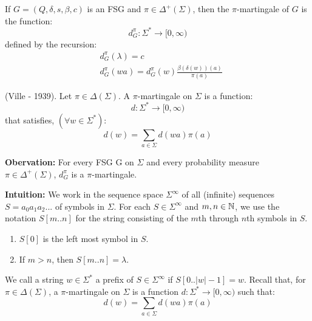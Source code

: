 \documentclass[../main.tex]{subfiles}
\begin{document}
\begin{defn}
        If $G = (Q, \delta, s, \beta, c)$ is an FSG and $\pi \in \Delta^{+}(\Sigma)$,
    then the $\pi$-martingale of $G$ is the function:
    \begin{equation*}
        d^{\pi}_{G}: \Sigma^{*} \rightarrow [0, \infty)
    \end{equation*}
    defined by the recursion:
    \begin{align*}
        & d^{\pi}_{G}(\lambda) = c \\
        & d^{\pi}_{G}(wa) = d^{\pi}_{G}(w) \frac{\beta(\delta(w))(a)}{\pi(a)}
    \end{align*}
\end{defn}

\begin{defn}
    (Ville - 1939). Let $\pi \in \Delta(\Sigma)$. A $\pi$-martingale on $\Sigma$
    is a function:
    \begin{equation*}
        d: \Sigma^{*} \rightarrow [0, \infty)
    \end{equation*}
    that satisfies, $(\forall w \in \Sigma^{*})$:
    \begin{equation}
        d(w) = \sum_{a \in \Sigma} d(wa)\pi(a)
    \end{equation}
\end{defn}

\textbf{Obervation:}
    For every FSG G on $\Sigma$ and every probability measure $\pi \in \Delta^{+}(\Sigma)$,
$d^{\pi}_{G}$ is a $\pi$-martingale.

\textbf{Intuition:}
We work in the sequence space $\Sigma^{\infty}$ of all (infinite) sequences
    $S = a_0 a_1 a_2 ... $
of symbols in $\Sigma$. For each $S \in \Sigma^{\infty}$ and $m, n \in \mathbb{N}$,
we use the notation $S[m..n]$ for the string consisting of the $m$th through
$n$th symbols in $S$.
\begin{enumerate}
    \item $S[0]$ is the left most symbol in $S$.
    \item If $m > n$, then $S[m..n] = \lambda$.
\end{enumerate}
We call a string $w \in \Sigma^{*}$ a prefix of $S \in \Sigma^{\infty}$ if
$S[0..|w|-1] = w$. Recall that, for $\pi \in \Delta(\Sigma)$, a $\pi$-martingale
on $\Sigma$ is a function $d:\Sigma^{*} \rightarrow [0, \infty)$ such that:
\begin{equation*}
    d(w) = \sum_{a \in \Sigma} d(wa) \pi(a)
\end{equation*}
\end{document}
